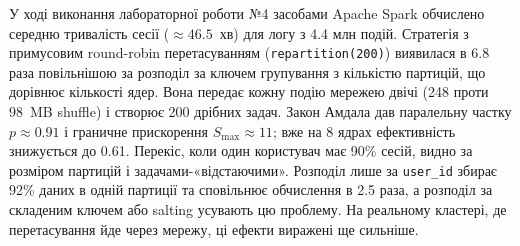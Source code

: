  У ході виконання лабораторної роботи №4 засобами Apache Spark обчислено середню тривалість сесії (\(\approx 46.5\)~хв) для логу з 4.4 млн подій. Стратегія з примусовим round-robin перетасуванням (\texttt{repartition(200)}) виявилася в 6.8 раза повільнішою за розподіл за ключем групування з кількістю партицій, що дорівнює кількості ядер. Вона передає кожну подію мережею двічі (248 проти 98~MB shuffle) і створює 200 дрібних задач. Закон Амдала дав паралельну частку \(p \approx 0.91\) і граничне прискорення \(S_{\max} \approx 11\); вже на 8 ядрах ефективність знижується до 0.61. Перекіс, коли один користувач має 90\% сесій, видно за розміром партицій і задачами-«відстаючими». Розподіл лише за \texttt{user\_id} збирає 92\% даних в одній партиції та сповільнює обчислення в 2.5 раза, а розподіл за складеним ключем або salting усувають цю проблему. На реальному кластері, де перетасування йде через мережу, ці ефекти виражені ще сильніше.


